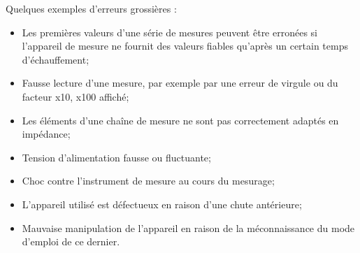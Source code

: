 Quelques exemples d'erreurs grossières :
\begin{itemize}
    \item Les premières valeurs d'une série de mesures peuvent être erronées si l'appareil de mesure ne fournit des valeurs fiables qu'après un certain temps d'échauffement;
    \item Fausse lecture d'une mesure, par exemple par une erreur de virgule ou du facteur x10, x100 affiché;
    \item Les éléments d'une chaîne de mesure ne sont pas correctement adaptés en impédance;
    \item Tension d'alimentation fausse ou fluctuante;
    \item Choc contre l'instrument de mesure au cours du mesurage;
    \item L'appareil utilisé est défectueux en raison d'une chute antérieure;
    \item Mauvaise manipulation de l'appareil en raison de la méconnaissance du mode d'emploi de ce dernier.
\end{itemize}

%
